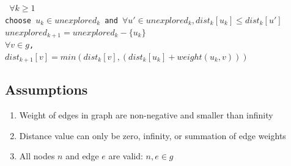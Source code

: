 \documentclass[11pt, oneside]{article}   	%
\newcommand\tab[1][1cm]{\hspace*{#1}}
\theoremstyle{definition}
\begin{document}
\\\\
\texttt{
  \tab\tab $\forall k \geq 1$\\
  \tab\tab choose $u_k \in unexplored_k$ and $\forall u' \in unexplored_k, dist_k[u_k] \leq dist_k[u']$ \\
  \tab\tab $unexplored_{k+1} = unexplored_k - \{u_k\}$                    \\
  \tab\tab $\forall v \in g$, \\
  \tab\tab\tab $dist_{k+1}[v] = min(dist_k[v], (dist_k[u_k] + weight(u_k,v)))$
  \tab\tab \\
}

\subsection{Assumptions}
\begin{enumerate}
  \item Weight of edges in graph are non-negative and smaller than infinity
  \item Distance value can only be zero, infinity, or summation of edge weights
  \item All nodes $n$ and edge $e$ are valid: $n, e \in g$
\end{enumerate}
\end{document}
